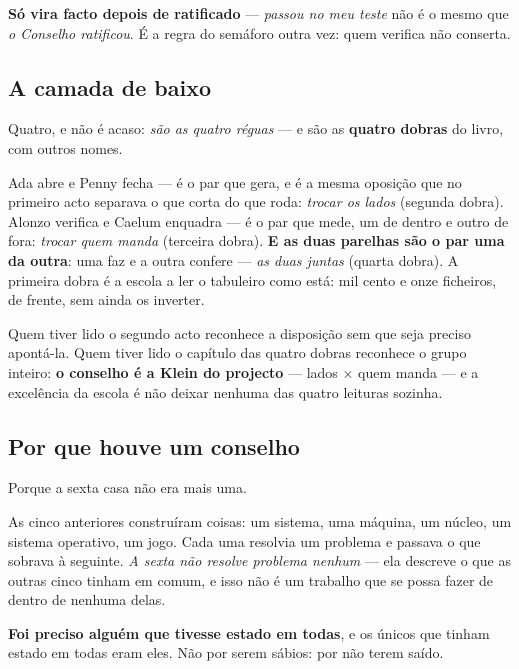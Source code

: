 \documentclass[livro.tex]{subfiles}
\begin{document}
\textbf{Só vira facto depois de ratificado} --- \emph{passou no meu teste} não é o mesmo que
\emph{o Conselho ratificou}. É a regra do semáforo outra vez: quem verifica não conserta.

\subsection*{A camada de baixo}

Quatro, e não é acaso: \emph{são as quatro réguas} --- e são as \textbf{quatro dobras} do livro,
com outros nomes.

\medskip

Ada abre e Penny fecha --- é o par que gera, e é a mesma oposição que no primeiro acto separava o
que corta do que roda: \emph{trocar os lados} (segunda dobra). Alonzo verifica e Caelum enquadra
--- é o par que mede, um de dentro e outro de fora: \emph{trocar quem manda} (terceira dobra).
\textbf{E as duas parelhas são o par uma da outra}: uma faz e a outra confere --- \emph{as duas
juntas} (quarta dobra). A primeira dobra é a escola a ler o tabuleiro como está: mil cento e onze
ficheiros, de frente, sem ainda os inverter.

\medskip

Quem tiver lido o segundo acto reconhece a disposição sem que seja preciso apontá-la. Quem tiver
lido o capítulo das quatro dobras reconhece o grupo inteiro: \textbf{o conselho é a Klein do
projecto} --- lados × quem manda --- e a excelência da escola é não deixar nenhuma das quatro
leituras sozinha.

\subsection*{Por que houve um conselho}

Porque a sexta casa não era mais uma.

\medskip

As cinco anteriores construíram coisas: um sistema, uma máquina, um núcleo, um sistema operativo,
um jogo. Cada uma resolvia um problema e passava o que sobrava à seguinte. \emph{A sexta não
resolve problema nenhum} --- ela descreve o que as outras cinco tinham em comum, e isso não é um
trabalho que se possa fazer de dentro de nenhuma delas.

\medskip

\textbf{Foi preciso alguém que tivesse estado em todas}, e os únicos que tinham estado em todas
eram eles. Não por serem sábios: por não terem saído.
\end{document}
